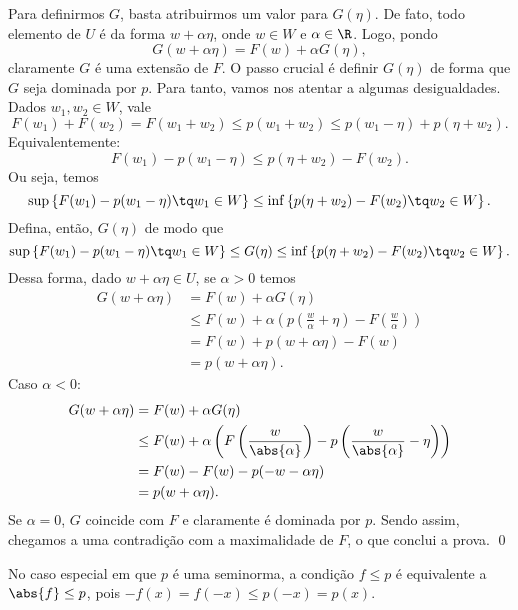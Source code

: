 Para definirmos \( G \), basta atribuirmos um valor para \( G(\eta) \).
De fato, todo elemento de \( U \) é da forma \( w + \alpha \eta \), onde \( w \in W \) e \( \alpha \in \R \).
Logo, pondo \[
    G(w + \alpha \eta) = F(w) + \alpha G(\eta)
,\]
claramente \( G \) é uma extensão de \( F \).
O passo crucial é definir \( G(\eta) \) de forma que \( G \) seja dominada por \( p \).
Para tanto, vamos nos atentar a algumas desigualdades.
Dados \( w_{ 1 }, w_{ 2 } \in W \), vale \[
    F(w_{ 1 }) + F(w_{ 2 }) =
    F(w_{ 1 } + w_{ 2 }) \leq
    p(w_{ 1 } + w_{ 2 }) \leq
    p(w_{ 1 } - \eta) + p(\eta + w_{ 2 })
.\]
Equivalentemente: \[
    F(w_{ 1 }) - p(w_{ 1 } - \eta) \leq p(\eta + w_{ 2 }) - F(w_{ 2 })
.\]
Ou seja, temos \[
    \sup \left\{ F(w_{ 1 }) - p(w_{ 1 } - \eta) \tq w_{ 1 } \in W \right\} \leq
    \inf \left\{ p(\eta + w_{ 2 }) - F(w_{ 2 }) \tq w_{ 2 } \in W \right\}
.\]
Defina, então, \( G(\eta) \) de modo que \[
    \sup \left\{ F(w_{ 1 }) - p(w_{ 1 } - \eta) \tq w_{ 1 } \in W \right\} \leq
    G(\eta) \leq
    \inf \left\{ p(\eta + w_{ 2 }) - F(w_{ 2 }) \tq w_{ 2 } \in W \right\}
.\]
Dessa forma, dado \( w + \alpha \eta \in U \), se \( \alpha > 0 \) temos
\begin{align*}
    G(w + \alpha \eta) &=
    F(w) + \alpha G(\eta) \\
    &\leq F(w) + \alpha \left( 
        p \left( \frac{ w }{ \alpha } + \eta \right) - F \left(  \frac{ w }{ \alpha }  \right)
    \right) \\
    &= F(w) + p(w + \alpha \eta) - F(w) \\
    &= p(w + \alpha \eta)
.\end{align*}
Caso \( \alpha < 0 \):
\begin{align*}
    G(w + \alpha \eta) &=
    F(w) + \alpha G(\eta) \\
    &\leq F(w) + \alpha \left( 
        F \left( \frac{ w }{ \abs{ \alpha } } \right) -
        p \left( \frac{ w }{ \abs{ \alpha } } - \eta \right)
    \right) \\
    &= F(w) - F(w) - p(-w - \alpha \eta) \\
    &= p(w + \alpha \eta)
.\end{align*}
Se \( \alpha = 0 \), \( G \) coincide com \( F \) e claramente é dominada por \( p \).
Sendo assim, chegamos a uma contradição com a maximalidade de \( F \), o que conclui a prova. \qed

No caso especial em que \( p \) é uma seminorma, a condição \( f \leq p \) é equivalente a \( \abs{ f } \leq p \), pois \( -f(x) = f(-x) \leq p(-x) = p(x) \).

